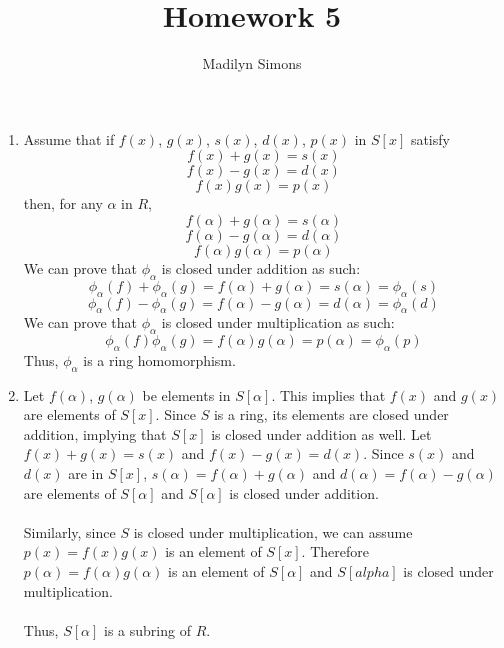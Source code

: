 \documentclass{article}
\title{Homework 5}
\author{Madilyn Simons}
\date{}
\begin{document}
\maketitle

\begin{enumerate}

\item Assume that if $f(x)$, $g(x)$, $s(x)$, $d(x)$, $p(x)$ in $S[x]$ satisfy
\[
f(x) + g(x) = s(x)
\] \[
f(x) - g(x) = d(x)
\] \[
f(x)g(x) = p(x)
\]
then, for any $\alpha$ in $R$,
\[
\] \[
f(\alpha) + g(\alpha) = s(\alpha)
\] \[
f(\alpha) - g(\alpha) = d(\alpha)
\] \[
f(\alpha)g(\alpha) = p(\alpha)
\]
We can prove that $\phi_{\alpha}$ is closed under addition as such:
\[
\phi_{\alpha}(f) + \phi_{\alpha}(g) = f(\alpha) + g(\alpha) = s(\alpha) = \phi_{\alpha}(s)
\] \[
\phi_{\alpha}(f) - \phi_{\alpha}(g) = f(\alpha) - g(\alpha) = d(\alpha) = \phi_{\alpha}(d)
\]
We can prove that $\phi_{\alpha}$ is closed under multiplication as such:
\[
\phi_{\alpha}(f)\phi_{\alpha}(g) = f(\alpha)g(\alpha) = p(\alpha) = \phi_{\alpha}(p)
\]
Thus, $\phi_{\alpha}$ is a ring homomorphism.

\item Let $f(\alpha)$, $g(\alpha)$ be elements in $S[\alpha]$.  This implies
that $f(x)$ and $g(x)$ are elements of $S[x]$.  Since $S$ is a ring, its
elements are closed under addition, implying that $S[x]$ is closed under
addition as well.  Let $f(x) + g(x) = s(x)$ and $f(x) - g(x) = d(x)$.  Since
$s(x)$ and $d(x)$ are in $S[x]$, $s(\alpha) = f(\alpha) + g(\alpha)$ and
$d(\alpha) = f(\alpha) - g(\alpha)$ are elements of $S[\alpha]$ and $S[\alpha]$
is closed under addition.
\\
\\
Similarly, since $S$ is closed under multiplication, we can assume $p(x) = f(x)g(x)$
is an element of $S[x]$.  Therefore $p(\alpha) = f(\alpha)g(\alpha)$ is an
element of $S[\alpha]$ and $S[alpha]$ is closed under multiplication.
\\
\\
Thus, $S[\alpha]$ is a subring of $R$.





\end{enumerate}
\end{document}
